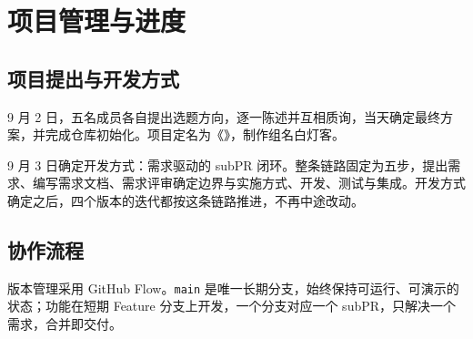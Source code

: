 %
%
%

\chapter{项目管理与进度}

\section{项目提出与开发方式}

9 月 2 日，五名成员各自提出选题方向，逐一陈述并互相质询，当天确定最终方案，并完成仓库初始化。项目定名为《\ProjectName》，制作组名白灯客。

9 月 3 日确定开发方式：需求驱动的 subPR 闭环。整条链路固定为五步，提出需求、编写需求文档、需求评审确定边界与实施方式、开发、测试与集成。开发方式确定之后，四个版本的迭代都按这条链路推进，不再中途改动。

\section{协作流程}

版本管理采用 GitHub Flow。\texttt{main} 是唯一长期分支，始终保持可运行、可演示的状态；功能在短期 Feature 分支上开发，一个分支对应一个 subPR，只解决一个需求，合并即交付。

